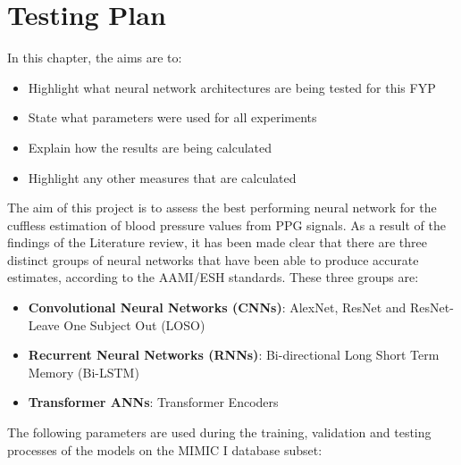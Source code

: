 \section{Testing Plan}

\begin{comment}
    Describe your Test Plan - how the program or system
was verified. Put the actual test results in an Appendix if they are repetitive but relevant. Detailed test data
may be omitted from the report if not relevant,
however an accurate summary of tests should be
included in the Report itself. Sometimes non-working
designs are described in project reports as though
they work, when in reality they don't, or only partially
work. Therefore a precise description of what works
and how this has been established is important.
Examiners may try to compile, use, or test
deliverables themselves (even after your report is
submitted), and your report should accurately reflect
the state of the project.
    
\end{comment}

In this chapter, the aims are to:

\begin{itemize}
    \item Highlight what neural network architectures are being tested for this FYP
    \item State what parameters were used for all experiments
    \item Explain how the results are being calculated
    \item Highlight any other measures that are calculated
\end{itemize}\noindent The aim of this project 
is to assess the best performing neural network 
for the cuffless estimation of blood pressure values 
from PPG signals. As a result of the findings of the Literature review, 
it has been made clear that there are three distinct groups of neural networks 
that have been able to produce accurate estimates, according to the AAMI/ESH standards. These three groups are:

\begin{itemize}
    \item \textbf{Convolutional Neural Networks (CNNs)}: AlexNet, ResNet and ResNet- Leave One Subject Out (LOSO)
    \item \textbf{Recurrent Neural Networks (RNNs)}: Bi-directional Long Short Term Memory (Bi-LSTM) 
    \item \textbf{Transformer ANNs}: Transformer Encoders
\end{itemize}\noindent The following parameters are used during the training, validation and testing processes of the models on the MIMIC I database subset:

